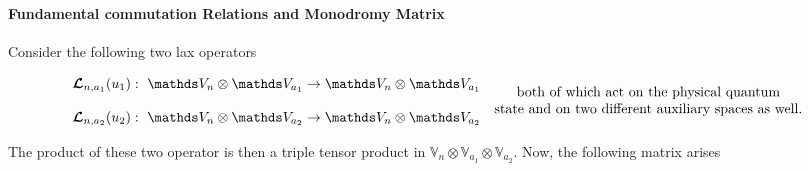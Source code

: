 \documentclass{homework}
\begin{document}
\blanky \\

\paragraph{\textbf{Fundamental commutation Relations and Monodromy Matrix}}

Consider the following two lax operators

\begin{equation*}
    \begin{array}{c}
        \bl_{n, a_1}(u_1): \blanky \vds_n \otimes \vds_{a_1} \rightarrow \vds_n \otimes \vds_{a_1}  \\
        \\
        \bl_{n, a_2}(u_2): \blanky \vds_n \otimes \vds_{a_2} \rightarrow \vds_n \otimes \vds_{a_2} 
    \end{array} \begin{array}{c}
         \textnormal{both of which act on the physical quantum}\\
         \textnormal{state and on two different auxiliary spaces as well.} 
    \end{array}
\end{equation*}

The product of these two operator is then a triple tensor product in $\mathds{V}_{n} \otimes \mathds{V}_{a_1} \otimes \mathds{V}_{a_2}$. Now, the following matrix arises 
\end{document}
